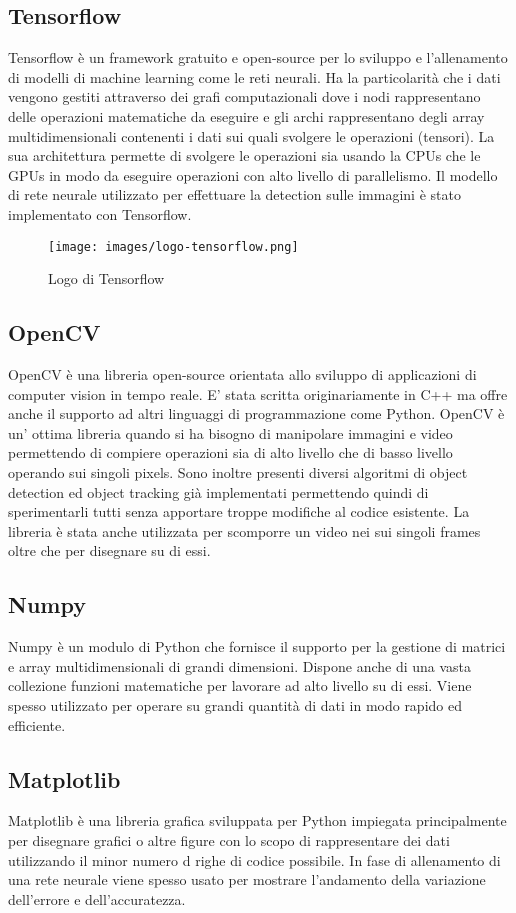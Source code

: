 \subsection{Tensorflow}
Tensorflow è un framework gratuito e open-source per lo sviluppo e l'allenamento di modelli di machine learning come le reti neurali. Ha la particolarità che i dati vengono gestiti attraverso dei grafi computazionali dove i nodi rappresentano delle operazioni matematiche da eseguire e gli archi rappresentano degli array multidimensionali contenenti i dati sui quali svolgere le operazioni (tensori). La sua architettura permette di svolgere le operazioni sia usando la CPUs che le GPUs in modo da eseguire operazioni con alto livello di parallelismo. Il modello di rete neurale utilizzato per effettuare la detection sulle immagini è stato implementato con Tensorflow.
\begin{figure}[H]
	\centering
	\texttt{[image: images/logo-tensorflow.png]}
	\caption{Logo di Tensorflow}
	\label{Logo di Tensorflow}
\end{figure}
\subsection{OpenCV}
OpenCV è una libreria open-source orientata allo sviluppo di applicazioni di computer vision in tempo reale. E' stata scritta originariamente in C++ ma offre anche il supporto ad altri linguaggi di programmazione come Python. OpenCV è un' ottima libreria quando si ha bisogno di manipolare immagini e video permettendo di compiere operazioni sia di alto livello che di basso livello operando sui singoli pixels. Sono inoltre presenti diversi algoritmi di object detection ed object tracking già implementati permettendo quindi di sperimentarli tutti senza apportare troppe modifiche al codice esistente. La libreria è stata anche utilizzata per scomporre un video nei sui singoli frames oltre che per disegnare su di essi.
\subsection{Numpy}
Numpy è un modulo di Python che fornisce il supporto per
la gestione di matrici e array multidimensionali di grandi dimensioni. Dispone anche di una vasta collezione funzioni matematiche per lavorare ad alto livello su di essi. Viene spesso utilizzato per operare su grandi quantità di dati in modo rapido ed efficiente.
\subsection{Matplotlib}
Matplotlib è una libreria grafica sviluppata per Python impiegata principalmente per disegnare grafici o altre figure con lo scopo di rappresentare dei dati utilizzando il minor numero d righe di codice possibile. In fase di allenamento di una rete neurale viene spesso usato per mostrare l'andamento della variazione dell'errore e dell'accuratezza.
